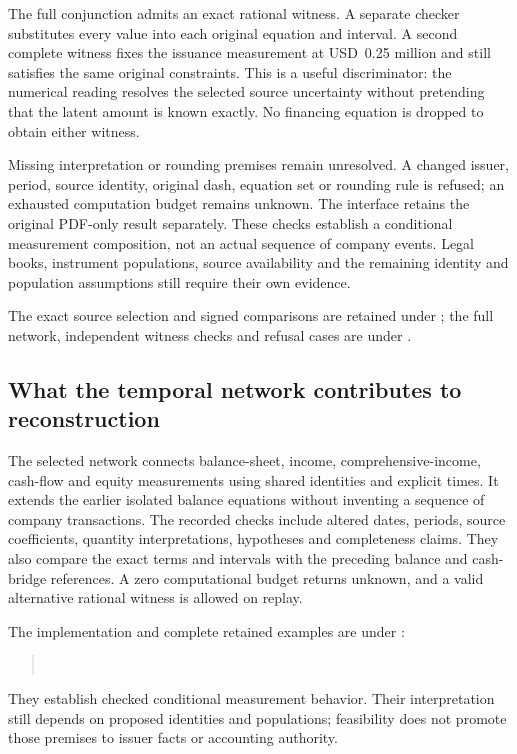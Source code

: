 The full conjunction admits an exact rational witness. A separate checker
substitutes every value into each original equation and interval. A second
complete witness fixes the issuance measurement at USD~0.25 million and
still satisfies the same original constraints. This is a useful discriminator:
the numerical reading resolves the selected source uncertainty without
pretending that the latent amount is known exactly. No financing equation is
dropped to obtain either witness.

Missing interpretation or rounding premises remain unresolved. A changed
issuer, period, source identity, original dash, equation set or rounding rule
is refused; an exhausted computation budget remains unknown. The interface
retains the original PDF-only result separately. These checks establish a
conditional measurement composition, not an actual sequence of company events.
Legal books, instrument populations, source availability and the remaining
identity and population assumptions still require their own evidence.

The exact source selection and signed comparisons are retained under
; the full network,
independent witness checks and refusal cases are under
.

\subsection{What the temporal network contributes to reconstruction}

The selected network connects balance-sheet, income, comprehensive-income,
cash-flow and equity measurements using shared identities and explicit times.
It extends the earlier isolated balance equations without inventing a sequence
of company transactions. The recorded checks include altered dates, periods,
source coefficients, quantity interpretations, hypotheses and completeness
claims. They also compare the exact terms and intervals with the preceding
balance and cash-bridge references. A zero computational budget returns unknown,
and a valid alternative rational witness is allowed on replay.

The implementation and complete retained examples are under
:
\begin{quote}\small
{}\\
\end{quote}
They establish checked conditional measurement behavior. Their interpretation
still depends on proposed identities and populations; feasibility does not
promote those premises to issuer facts or accounting authority.

